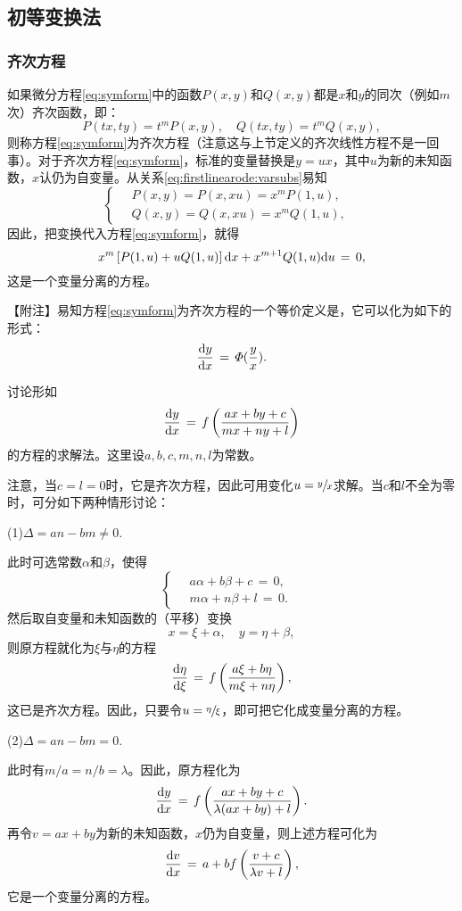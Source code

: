 \subsection{初等变换法}
\subsubsection{齐次方程}
如果微分方程\eqref{eq:symform}中的函数$P(x,y)$和$Q(x,y)$都是$x$和$y$的同次（例如$m$次）齐次函数，即：
\begin{equation}\label{eq:firstlinearode:varsubs}
P(tx,ty)=t^mP(x,y),\quad Q(tx,ty)=t^mQ(x,y),
\end{equation}
则称方程\eqref{eq:symform}为{\heiti 齐次方程}（注意这与上节定义的齐次线性方程不是一回事）。对于齐次方程\eqref{eq:symform}，标准的变量替换是$y=ux$，其中$u$为新的未知函数，$x$认仍为自变量。从关系\eqref{eq:firstlinearode:varsubs}易知
\begin{equation*}
    \begin{cases}
        \quad P(x,y)=P(x,xu)=x^mP(1,u), &\\
        \quad Q(x,y)=Q(x,xu)=x^mQ(1,u), &
    \end{cases}
\end{equation*}
因此，把变换代入方程\eqref{eq:symform}，就得
$$x^m\left[P(1,u)+uQ(1,u)\right]\mathrm{d} x+x^{m+1}Q(1,u)\mathrm{d} u\,=\,0,$$
这是一个变量分离的方程。\par
{\heiti 【附注】\quad}易知方程\eqref{eq:symform}为齐次方程的一个等价定义是，它可以化为如下的形式：
$$\frac{\mathrm{d} y}{\mathrm{d} x}\,=\,\varPhi(\frac yx).$$

\begin{example}
讨论形如$$\frac{\mathrm{d} y}{\mathrm{d} x}\,=\,f\left(\frac{ax+by+c}{mx+ny+l}\right)$$的方程的求解法。这里设$a,b,c,m,n,l$为常数。
\end{example}\par
注意，当$c=l=0$时，它是齐次方程，因此可用变化$u=\sfrac{y}{x}$求解。当$c$和$l$不全为零时，可分如下两种情形讨论：\par
(1)\quad $\Delta=an-bm\neq 0.$\par
此时可选常数$\alpha$和$\beta$，使得
$$\begin{cases}
\quad a\alpha+b\beta+c\,=\,0, &\\
\quad m\alpha+n\beta+l\,=\,0.
\end{cases}$$
然后取自变量和未知函数的（平移）变换
$$x=\xi+\alpha,\quad y=\eta+\beta,$$
则原方程就化为$\xi$与$\eta$的方程
$$\frac{\mathrm{d}{}\eta}{\mathrm{d}{}\xi}\,=\,f\left(\frac{a\xi+b\eta}{m\xi+n\eta}\right),$$
这已是齐次方程。因此，只要令$u=\sfrac{\eta}{\xi}$，即可把它化成变量分离的方程。\par
(2)\quad $\Delta=an-bm=0.$\par
此时有$m/a=n/b=\lambda$。因此，原方程化为
$$\frac{\mathrm{d}{}y}{\mathrm{d}{}x}\,=\,f\left(\frac{ax+by+c}{\lambda(ax+by)+l}\right).$$
再令$v=ax+by$为新的未知函数，$x$仍为自变量，则上述方程可化为
$$
\frac{\mathrm{d}{}v}{\mathrm{d}{}x}\,=\,a+bf\left(\frac{v+c}{\lambda v+l}\right),$$
它是一个变量分离的方程。

